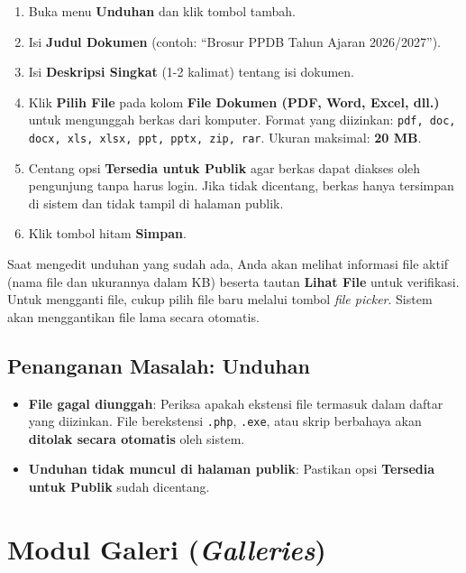 \begin{enumerate}
  \item Buka menu \textbf{Unduhan} dan klik tombol tambah.
  \item Isi \textbf{Judul Dokumen} (contoh: ``Brosur PPDB Tahun Ajaran 2026/2027'').
  \item Isi \textbf{Deskripsi Singkat} (1-2 kalimat) tentang isi dokumen.
  \item Klik \textbf{Pilih File} pada kolom \textbf{File Dokumen (PDF, Word, Excel, dll.)}
        untuk mengunggah berkas dari komputer. Format yang diizinkan:
        \texttt{pdf, doc, docx, xls, xlsx, ppt, pptx, zip, rar}.
        Ukuran maksimal: \textbf{20 MB}.
  \item Centang opsi \textbf{Tersedia untuk Publik} agar berkas dapat diakses oleh
        pengunjung tanpa harus login.
        Jika tidak dicentang, berkas hanya tersimpan di sistem dan tidak tampil di halaman publik.
  \item Klik tombol hitam \textbf{Simpan}.
\end{enumerate}

\begin{notebox}
  Saat mengedit unduhan yang sudah ada, Anda akan melihat informasi file aktif
  (nama file dan ukurannya dalam KB) beserta tautan \textbf{Lihat File} untuk verifikasi.
  Untuk mengganti file, cukup pilih file baru melalui tombol \textit{file picker}.
  Sistem akan menggantikan file lama secara otomatis.
\end{notebox}

\subsection{Penanganan Masalah: Unduhan}

\begin{itemize}
  \item \textbf{File gagal diunggah}: Periksa apakah ekstensi file termasuk dalam
        daftar yang diizinkan. File berekstensi \texttt{.php}, \texttt{.exe}, atau
        skrip berbahaya akan \textbf{ditolak secara otomatis} oleh sistem.
  \item \textbf{Unduhan tidak muncul di halaman publik}: Pastikan opsi
        \textbf{Tersedia untuk Publik} sudah dicentang.
\end{itemize}

\section{Modul Galeri (\textit{Galleries})}

